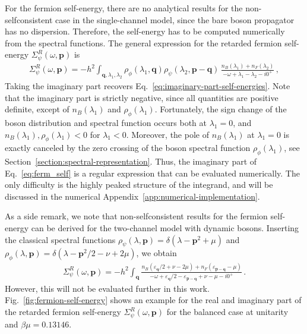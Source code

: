 For the fermion self-energy, there are no analytical results for the non-selfconsistent case in the single-channel model, since the bare boson propagator has no dispersion. Therefore, the self-energy has to be computed numerically from the spectral functions. The general expression for the retarded fermion self-energy $\Sigma^R_{\psi}(\omega,\bm{p})$ is
%
\begin{align}
	\label{eq:ferm_self}
	\Sigma^R_{\psi}(\omega,\bm{p}) = -h^2\int_{\bm{q},\lambda_1,\lambda_2} \rho_{\phi}(\lambda_1,\bm{q}) \rho_{\psi}(\lambda_2,\bm{p}-\bm{q})\, \frac{n_B(\lambda_1)+n_F(\lambda_2)}{-\omega+\lambda_1-\lambda_2-i0^+} \,,
\end{align}
%
Taking the imaginary part recovers Eq.~\eqref{eq:imaginary-part-self-energies}. Note that the imaginary part is strictly negative, since all quantities are positive definite, except of $n_B(\lambda_1)$ and $\rho_{\phi}(\lambda_1)$. Fortunately, the sign change of the boson distribution and spectral function occurs both at $\lambda_1=0$, and $n_B(\lambda_1),\rho_{\phi}(\lambda_1)<0$ for $\lambda_1<0$. Moreover, the pole of $n_B(\lambda_1)$ at $\lambda_1=0$ is exactly canceled by the zero crossing of the boson spectral function $\rho_{\phi}(\lambda_1)$, see Section~\ref{section:spectral-representation}. Thus, the imaginary part of Eq.~\eqref{eq:ferm_self} is a regular expression that can be evaluated numerically. The only difficulty is the highly peaked structure of the integrand, and will be discussed in the numerical Appendix~\ref{app:numerical-implementation}.

As a side remark, we note that non-selfconsistent results for the fermion self-energy can be derived for the two-channel model with dynamic bosons. Inserting the classical spectral functions $\rho_{\psi}(\lambda,\bm{p})=\delta(\lambda-\bm{p}^2+\mu)$ and $\rho_{\phi}(\lambda,\bm{p})=\delta(\lambda-\bm{p}^2/2-\nu+2\mu)$, we obtain
\begin{align}
\Sigma^R_{\psi}(\omega, \bm{p}) = -h^2 \int_{\bm{q}} \frac{n_B(\varepsilon_{\bm{q}}/2+\nu-2\mu) + n_F(\varepsilon_{\bm{p-q}}-\mu)}{-\omega+\varepsilon_{\bm{q}}/2- \varepsilon_{\bm{p-q}}+\nu-\mu-i0^+} \,.
\end{align}
However, this will not be evaluated further in this work. \\

Fig.~\ref{fig:fermion-self-energy} shows an example for the real and imaginary part of the retarded fermion self-energy $\Sigma^{R}_{\psi}(\omega,\bm{p})$ for the balanced case at unitarity and $\beta\mu=0.13146$.

